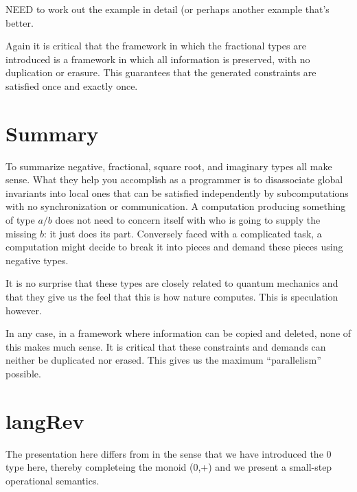 \documentclass[preprint]{sigplanconf}
\begin{document}
NEED to work out the example in detail (or perhaps another example that's
better. 

Again it is critical that the framework in which the fractional types are
introduced is a framework in which all information is preserved, with no
duplication or erasure. This guarantees that the generated constraints are
satisfied once and exactly once. 

\section{Summary}

To summarize negative, fractional, square root, and imaginary types all make
sense. What they help you accomplish as a programmer is to disassociate
global invariants into local ones that can be satisfied independently by
subcomputations with no synchronization or communication. A computation
producing something of type $a/b$ does not need to concern itself with who is
going to supply the missing $b$: it just does its part. Conversely faced with
a complicated task, a computation might decide to break it into pieces and
demand these pieces using negative types. 

It is no surprise that these types are closely related to quantum mechanics
and that they give us the feel that this is how nature computes. This is
speculation however.

In any case, in a framework where information can be copied and deleted, none
of this makes much sense. It is critical that these constraints and demands
can neither be duplicated nor erased.  This gives us the maximum
``parallelism'' possible.

\section{ {{langRev}} }

The presentation here differs from \cite{infeffects} in the sense that
we have introduced the {{0}} type here, thereby completeing the monoid
{{(0,+)}} and we present a small-step operational semantics. 


\end{document}
